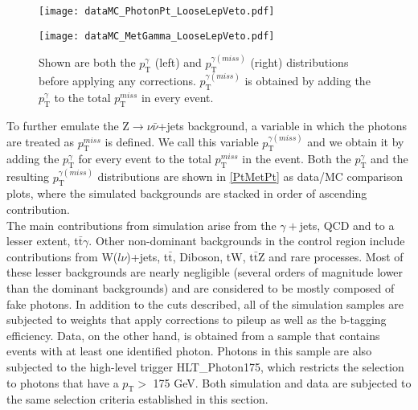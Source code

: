 \begin{figure}[H]
\begin{center}
\begin{minipage}[b]{0.45\textwidth}
    \texttt{[image: dataMC\_PhotonPt\_LooseLepVeto.pdf]}
\end{minipage}
\begin{minipage}[b]{0.45\textwidth}
    \texttt{[image: dataMC\_MetGamma\_LooseLepVeto.pdf]}
\end{minipage}
\end{center}
\vspace{-1em}
\caption{Shown are both the $p_\text{T}^{\gamma}$ (left) and $p_\text{T}^{\gamma (miss)}$ (right) distributions before applying any corrections. $p_\text{T}^{\gamma (miss)}$ is obtained by adding the $p_\text{T}^{\gamma}$ to the total $p_\text{T}^{miss}$ in every event.}
\label{PtMetPt}
\end{figure}
\vspace{1em}

To further emulate the Z$\rightarrow\nu\bar{\nu}$+jets background, a variable in which the photons are treated as $p_\text{T}^{miss}$ is defined. We call this variable $p_\text{T}^{\gamma (miss)}$ and we obtain it by adding the $p_\text{T}^{\gamma}$ for every event to the total $p_\text{T}^{miss}$ in the event. Both the $p_\text{T}^{\gamma}$ and the resulting $p_\text{T}^{\gamma (miss)}$ distributions are shown in \autoref{PtMetPt} as data/MC comparison plots, where the simulated backgrounds are stacked in order of ascending contribution.\\

The main contributions from simulation arise from the $\gamma+$jets, QCD and to a lesser extent, t$\bar{\text{t}}\gamma$. Other non-dominant backgrounds in the control region include contributions from W($l\nu$)+jets, t$\bar{\text{t}}$, Diboson, tW, t$\bar{\text{t}}$Z and rare processes. Most of these lesser backgrounds are nearly negligible (several orders of magnitude lower than the dominant backgrounds) and are considered to be mostly composed of fake photons. In addition to the cuts described, all of the simulation samples are subjected to weights that apply corrections to pileup as well as the b-tagging efficiency. Data, on the other hand, is obtained from a sample that contains events with at least one identified photon. Photons in this sample are also subjected to the high-level trigger HLT\_Photon175, which restricts the selection to photons that have a $p_\text{T} >$ 175 GeV. Both simulation and data are subjected to the same selection criteria established in this section. 

